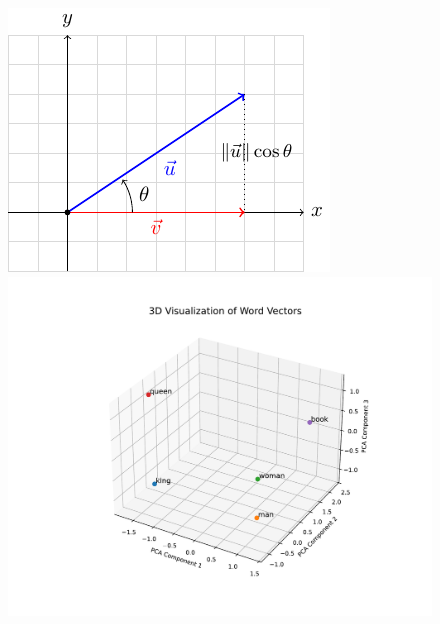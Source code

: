 \begin{figure}[H]
    \begin{minipage}{0.48\textwidth} %
        \centering
        \includegraphics[width=0.6\linewidth]{figures/cosine_similarity_example.pdf}
    \end{minipage}
    \hfill
    \begin{minipage}{0.48\textwidth} %
        \centering
        \includegraphics[trim=2cm 2cm 1cm 3cm, clip, width=\linewidth]{figures/word_vector_example.pdf}
    \end{minipage}
\end{figure}